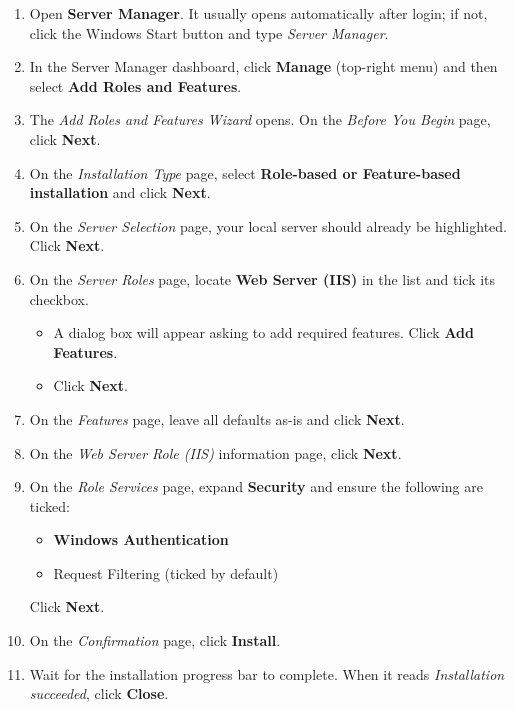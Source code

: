 \documentclass[12pt,a4paper]{report}
\begin{document}
\begin{enumerate}
  \item Open \textbf{Server Manager}. It usually opens automatically after login; if not, click the Windows Start button and type \emph{Server Manager}.

  \item In the Server Manager dashboard, click \textbf{Manage} (top-right menu) and then select \textbf{Add Roles and Features}.

  \item The \emph{Add Roles and Features Wizard} opens. On the \emph{Before You Begin} page, click \textbf{Next}.

  \item On the \emph{Installation Type} page, select \textbf{Role-based or Feature-based installation} and click \textbf{Next}.

  \item On the \emph{Server Selection} page, your local server should already be highlighted. Click \textbf{Next}.

  \item On the \emph{Server Roles} page, locate \textbf{Web Server (IIS)} in the list and tick its checkbox.
  \begin{itemize}
    \item A dialog box will appear asking to add required features. Click \textbf{Add Features}.
    \item Click \textbf{Next}.
  \end{itemize}

  \item On the \emph{Features} page, leave all defaults as-is and click \textbf{Next}.

  \item On the \emph{Web Server Role (IIS)} information page, click \textbf{Next}.

  \item On the \emph{Role Services} page, expand \textbf{Security} and ensure the following are ticked:
  \begin{itemize}
    \item \textbf{Windows Authentication}
    \item Request Filtering (ticked by default)
  \end{itemize}
  Click \textbf{Next}.

  \item On the \emph{Confirmation} page, click \textbf{Install}.

  \item Wait for the installation progress bar to complete. When it reads \emph{Installation succeeded}, click \textbf{Close}.
\end{enumerate}
\end{document}

